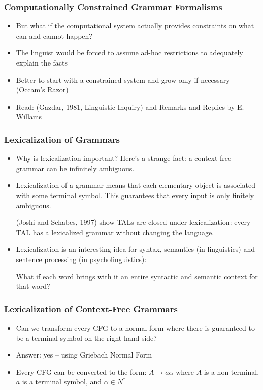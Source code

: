 \documentclass[compress,color=usenames]{beamer}
\begin{document}
\begin{frame}
\frametitle{Computationally Constrained Grammar Formalisms}

\begin{itemize}

\item But what if the computational system actually provides constraints on
what can and cannot happen?

\item The linguist would be forced to assume ad-hoc restrictions to adequately
explain the facts

\item Better to start with a constrained system and grow only if necessary
(Occam's Razor)

\item Read: (Gazdar, 1981, Linguistic Inquiry) and Remarks and Replies by E.
Willams

\end{itemize}
\end{frame}


\begin{frame}
\frametitle{Lexicalization of Grammars}

\begin{itemize}

\item Why is lexicalization important? Here's a strange fact: a context-free
grammar can be infinitely ambiguous.

\item Lexicalization of a grammar means that each elementary object is
associated with some terminal symbol. This guarantees that every input
is only finitely ambiguous.

(Joshi and Schabes, 1997) show TALs are closed under lexicalization:
every TAL has a lexicalized grammar without changing the language.

\item Lexicalization is an interesting idea for syntax, semantics (in linguistics)
and sentence processing (in psycholinguistics):

What if each word brings with it an entire syntactic and semantic context
for that word?

\end{itemize}
\end{frame}

\begin{frame}
\frametitle{Lexicalization of Context-Free Grammars}

\begin{itemize}

\item Can we transform every CFG to a normal form where there is guaranteed
to be a terminal symbol on the right hand side?

\item Answer: yes -- using Griebach Normal Form

\item Every CFG can be converted to the form: $A \rightarrow a \alpha$ where $A$ is a
non-terminal, $a$ is a terminal symbol, and $\alpha \in N^*$

\end{itemize}
\end{frame}
\end{document}
